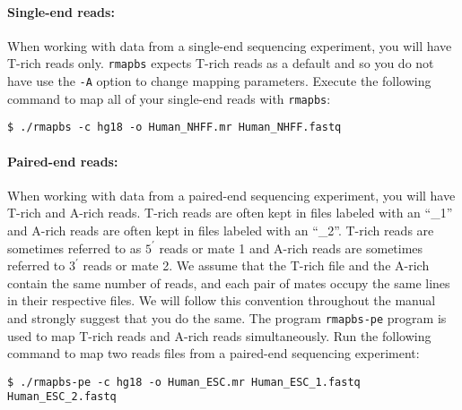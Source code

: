 \documentclass[10pt]{article}
\newcommand{\prog}[1]{\texttt{#1}}
\newcommand{\op}[1]{\texttt{#1}}
\begin{document}









\paragraph{Single-end reads:}
When working with data from a single-end sequencing experiment, you
will have T-rich reads only. \prog{rmapbs} expects T-rich reads as a
default and so you do not have use the \op{-A} option to change
mapping parameters. Execute the following command to map all of your
single-end reads with \prog{rmapbs}:
\begin{verbatim}
$ ./rmapbs -c hg18 -o Human_NHFF.mr Human_NHFF.fastq
\end{verbatim}

\paragraph{Paired-end reads:}
When working with data from a paired-end sequencing experiment, you
will have T-rich and A-rich reads. T-rich reads are often kept in
files labeled with an ``\_1'' and A-rich reads are often kept in files
labeled with an ``\_2''.  T-rich reads are sometimes referred to as
$5^{\prime}$ reads or mate 1 and A-rich reads are sometimes referred
to $3^{\prime}$ reads or mate 2. We assume that the T-rich file and
the A-rich contain the same number of reads, and each pair of mates
occupy the same lines in their respective files. We will follow this
convention throughout the manual and strongly suggest that you do the
same. The program \prog{rmapbs-pe} program is used to map T-rich reads
and A-rich reads simultaneously. Run the following command to map two
reads files from a paired-end sequencing experiment:
\begin{verbatim}
$ ./rmapbs-pe -c hg18 -o Human_ESC.mr Human_ESC_1.fastq Human_ESC_2.fastq
\end{verbatim}
\end{document}
